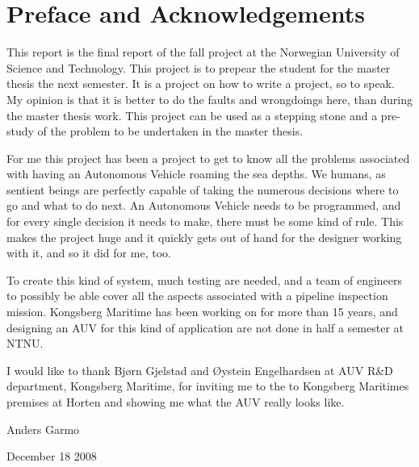 \chapter{Preface and Acknowledgements}
	This report is the final report of the fall project at the Norwegian University of Science and Technology.
	This project is to prepear the student for the master thesis the next semester. It is a
	project on how to write a project, so to speak. My opinion is that it is better to do the faults and wrongdoings
	here, than during the master thesis work. This project can be used as a stepping stone and a pre-study of
	the problem to be undertaken in the master thesis.

	For me this project has been a project to get to know all the problems associated with having an 
	Autonomous Vehicle roaming the sea depths. We humans, as sentient beings are perfectly capable 
	of taking the numerous decisions where
	to go and what to do next. An Autonomous Vehicle needs to be programmed, and for every single
	decision it needs to make, there must be some kind of rule. This makes the project huge and it quickly gets 
	out of hand for the designer working with it, and so it did for me, too.

	To create this kind of system, much testing are needed, and a team of engineers to possibly be able cover all
	the aspects associated with a pipeline inspection mission. Kongsberg Maritime has been working on \hugin for
	more than 15 years, and designing an AUV for this kind of application are not done in half a semester
	at NTNU. 
	
	I would like to thank Bjørn Gjelstad and Øystein Engelhardsen at AUV R\&D department, Kongsberg Maritime, for 
	inviting me to the to Kongsberg Maritimes premises at Horten and showing me what the \hugin AUV really looks
	like.

	\hfill
	
	Anders Garmo 
	
	December 18 2008
	
	


